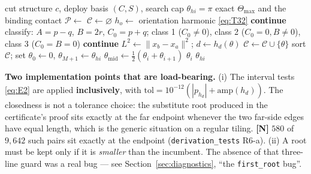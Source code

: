 \documentclass[11pt,a4paper]{article}
\theoremstyle{definition}
\newcommand{\Tmax}{\Theta_{\max}}
\newcommand{\file}[1]{\texttt{\small #1}}
\begin{document}
\begin{algorithm}[t]
\caption{Exact $\Tmax$ (T4.2$''$) --- \file{method/contact.jl::exact\_theta\_max\_overlap}}
\label{alg:tmax}
\begin{algorithmic}[1]
\Require cut structure $c$, deploy basis $(C,S)$, search cap $\theta_{hi}=\pi$
\Ensure exact $\Tmax$ and the binding contact
\State $\mathcal{P}\gets$  
\State $\mathcal{C}\gets\varnothing$
  \State $h_o\gets$ orientation harmonic \eqref{eq:T32}
   \State \textbf{continue} 
  \EndIf
  \State classify: $A\!=\!p-q$, $B\!=\!2r$, $C_0\!=\!p+q$; class 1 ($C_0\!\ne\!0$), class 2 ($C_0\!=\!0,B\!\ne\!0$), class 3 ($C_0\!=\!B\!=\!0$)
   \State \textbf{continue} 
  \EndIf
  \ForAll{roots $\theta$ of $h_o$ in $(0,\theta_{hi}]$, deflated at $\tau=0$ by the class}
    \State $L^2\gets\|x_b-x_a\|^2$; $d\gets h_d(\theta)$ 
     
      \State $\mathcal{C}\gets\mathcal{C}\cup\{\theta\}$
    \EndIf
  \EndFor
\EndFor
\State sort $\mathcal{C}$; set $\theta_0\gets0$, $\theta_{M+1}\gets\theta_{hi}$
  \State $\theta_{\mathrm{mid}}\gets\tfrac12(\theta_i+\theta_{i+1})$
   \State \Return $\theta_i$ 
  \EndIf
\EndFor
\State \Return $\theta_{hi}$
\end{algorithmic}
\end{algorithm}

\textbf{Two implementation points that are load-bearing.} (i) The interval tests
\eqref{eq:E2} are applied \textbf{inclusively}, with
$\mathrm{tol}=10^{-12}(|p_{h_d}|+\mathrm{amp}(h_d))$. The closedness is not a tolerance
choice: the substitute root produced in the certificate's proof sits exactly at the far
endpoint whenever the two far-side edges have equal length, which is the generic situation on
a regular tiling. \textbf{[N]} $580$ of $9{,}642$ such pairs sit exactly at the endpoint
(\file{derivation\_tests} R6-a). (ii) A root must be kept only if it is \emph{smaller} than
the incumbent. The absence of that three-line guard was a real bug --- see
Section~\ref{sec:diagnostics}, ``the \file{first\_root} bug''.
\end{document}
